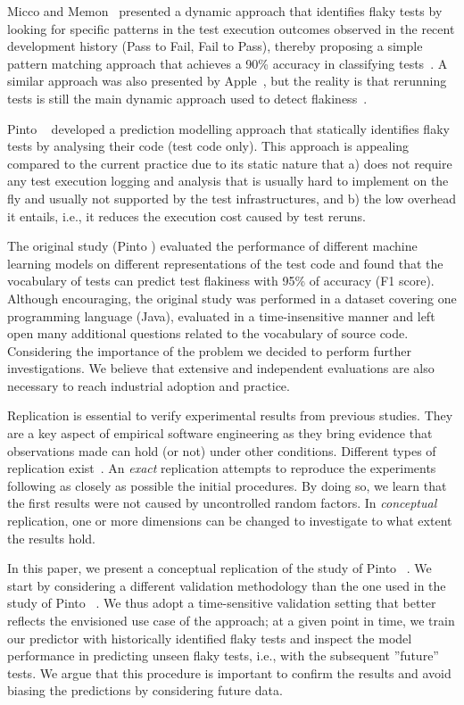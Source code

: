 Micco and Memon~\cite{GTAC2016} presented a dynamic approach that identifies flaky tests by looking for specific patterns in the test execution outcomes observed in the recent development history (Pass to Fail, Fail to Pass), thereby proposing a simple pattern matching approach that achieves a 90\% accuracy in classifying tests~\cite{GTAC2016}. A similar approach was also presented by Apple~\cite{Kowalczyk2020}, but the reality is that rerunning tests is still the main dynamic approach used to detect flakiness~\cite{FlakinessGoogle}.

Pinto \etal~\cite{Pinto2020} developed a prediction modelling approach that statically identifies flaky tests by analysing their code (test code only). This approach is appealing compared to the current practice due to its static nature that a) does not require any test execution logging and analysis that is usually hard to implement on the fly and usually not supported by the test infrastructures, and b) the low overhead it entails, i.e., it reduces the execution cost caused by test reruns. 

The original study (Pinto \etal) evaluated the performance of different machine learning models on different representations of the test code and found that the vocabulary of tests can predict test flakiness with 95\% of accuracy (F1 score).
Although encouraging, the original study was performed in a dataset covering one programming language (Java), evaluated in a time-insensitive manner and left open many additional questions related to the vocabulary of source code. 
Considering the importance of the problem we decided to perform further investigations. We believe that extensive and independent evaluations are also necessary to reach industrial adoption and practice. 

Replication is essential to verify experimental results from previous studies. They are a key aspect of empirical software engineering as they bring evidence that observations made can hold (or not) under other conditions. Different types of replication exist~\cite{Shull2008,Gomez2014}. An \textit{exact} replication attempts to reproduce the experiments following as closely as possible the initial procedures. By doing so, we learn that the first results were not caused by uncontrolled random factors. In \textit{conceptual} replication, one or more dimensions can be changed to investigate to what extent the results hold. 

In this paper, we present a conceptual replication of the study of Pinto \etal~\cite{Pinto2020}.
We start by considering a different validation methodology than the one used in the study of Pinto \etal~\cite{Pinto2020}. We thus adopt a time-sensitive validation setting that better reflects the envisioned use case of the approach; at a given point in time, we train our predictor with historically identified flaky tests and inspect the model performance in predicting unseen flaky tests, i.e., with the subsequent ''future'' tests.  
We argue that this procedure is important to confirm the results and avoid biasing the predictions by considering future data. 

